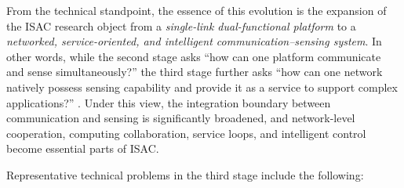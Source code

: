 From the technical standpoint, the essence of this evolution is the expansion of the ISAC research object from a \emph{single-link dual-functional platform} to a \emph{networked, service-oriented, and intelligent communication--sensing system}. In other words, while the second stage asks ``how can one platform communicate and sense simultaneously?'' the third stage further asks ``how can one network natively possess sensing capability and provide it as a service to support complex applications?'' \cite{Zhang2020perceptive,Cui2024integrated}. Under this view, the integration boundary between communication and sensing is significantly broadened, and network-level cooperation, computing collaboration, service loops, and intelligent control become essential parts of ISAC.

Representative technical problems in the third stage include the following:

